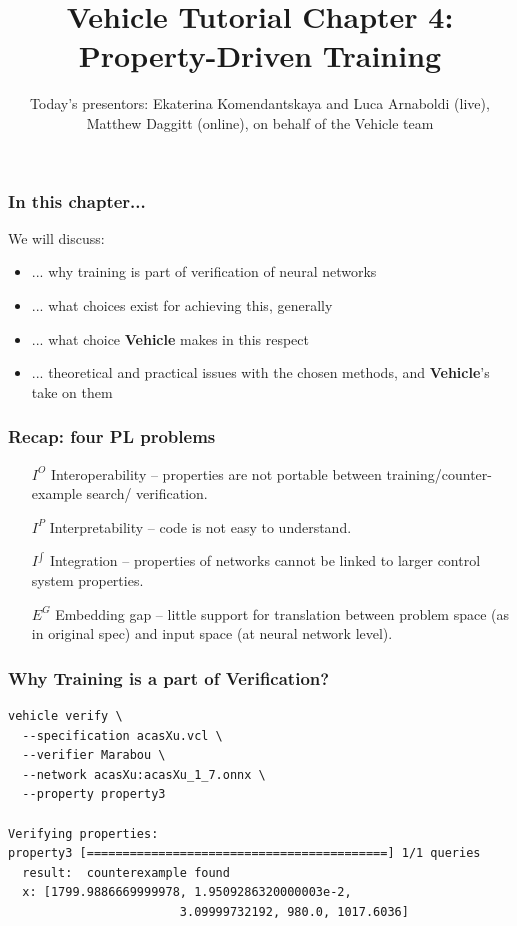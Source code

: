 \documentclass[aspectratio=169]{beamer}
\title[Vehicle Tutorial Chapter 4]{Vehicle Tutorial Chapter 4: Property-Driven Training}
\author[Vehicle]{Today's presentors: Ekaterina Komendantskaya and Luca Arnaboldi  (live), Matthew Daggitt (online), on behalf of the Vehicle team}
\institute[]{}
\date[]{}
\newcommand\BackgroundPicture[1]{%
  \setbeamertemplate{background}{%
   \parbox[c][\paperheight]{\paperwidth}{%
      \vfill \hfill
\texttt{[image: \#1]}
        \hfill \vfill
     }}}
\begin{document}
\BackgroundPicture{logo1.png}

\begin{frame}
\titlepage
\end{frame}

\begin{frame}
\frametitle{In this chapter...}

We will discuss:

\begin{itemize}[<+->]
\item  ...  why training is part of verification of neural networks
\item ... what choices exist for achieving this, generally
\item ... what choice \textbf{Vehicle} makes in this respect
\item ... theoretical and practical issues with the chosen methods, and \textbf{Vehicle}'s
take on them
\end{itemize}

\end{frame}


\begin{frame}
\frametitle{Recap: four PL problems}

\pause
\begin{itemize}
\item[$I^O$] \alert{Interoperability -- properties are not portable between training/counter-example search/ verification.}

\item[$I^{P}$] Interpretability -- code is not easy to understand.

\item[$I^{\int}$] Integration -- properties of networks cannot be linked to larger control system properties.

\item[$E^G$] Embedding gap -- little support for translation between problem space (as in original spec) and input space (at neural network level).
\end{itemize}
\end{frame}


    \begin{frame}[fragile]
\frametitle{Why Training is a part of Verification?}

\begin{verbatim}
vehicle verify \
  --specification acasXu.vcl \
  --verifier Marabou \
  --network acasXu:acasXu_1_7.onnx \
  --property property3

Verifying properties:
property3 [==========================================] 1/1 queries
  result:  counterexample found
  x: [1799.9886669999978, 1.9509286320000003e-2, 
                        3.09999732192, 980.0, 1017.6036]
\end{verbatim}

\end{frame}
\end{document}
